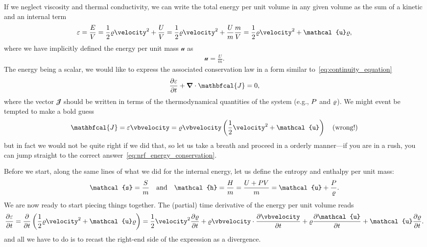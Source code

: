 If we neglect viscosity and thermal conductivity, we can write the total energy per
unit volume in any given volume as the sum of a kinetic and an internal term
\begin{align}
  \varepsilon = \frac{E}{V} = \frac{1}{2}\density \velocity^2 + \frac{U}{V} =
  \frac{1}{2}\density \velocity^2 + \frac{U}{m} \frac{m}{V} =
  \frac{1}{2}\density \velocity^2 + \mathcal{u} \density,
\end{align}
where we have implicitly defined the energy per unit mass $\mathcal{u}$ as
\begin{align*}
  \mathcal{u} = \frac{U}{m}.
\end{align*}
The energy being a scalar, we would like to express the associated conservation
law in a form similar to~\eqref{eq:continuity_equation}
\begin{align*}
  \pdv{\varepsilon}{t} + \vnabla \cdot \mathbfcal{J} = 0,
\end{align*}
where the vector $\mathbfcal{J}$ should be written in terms of the thermodynamical
quantities of the system (e.g., $P$ and $\varrho$). We might event be tempted
to make a bold guess
\begin{align*}
  \mathbfcal{J} = \varepsilon \vbvelocity =
  \density \vbvelocity \left( \frac{1}{2}\velocity^2 + \mathcal{u} \right)
  \quad \text{(wrong!)}
\end{align*}
but in fact we would not be quite right if we did that, so let us take a breath and proceed
in a orderly manner---if you are in a rush, you can jump straight to the correct
answer~\eqref{eq:nrf_energy_conservation}.

Before we start, along the same lines of what we did for the internal energy, let
us define the entropy and enthalpy per unit mass:
\begin{align*}
  \mathcal{s} = \frac{S}{m}
  \quad\text{and}\quad
  \mathcal{h} = \frac{H}{m} = \frac{U + \pressure V}{m} =
  \mathcal{u} + \frac{\pressure}{\density}.
\end{align*}
We are now ready to start piecing things together. The (partial) time derivative
of the energy per unit volume reads
\begin{align*}
  \pdv{\varepsilon}{t} =
  \pdv{}{t}\left( \frac{1}{2} \density \velocity^2 + \mathcal{u} \density \right) =
  \frac{1}{2} \velocity^2 \pdv{\density}{t} + \density \vbvelocity \cdot \pdv{\vbvelocity}{t} +
  \density \pdv{\mathcal{u}}{t} + \mathcal{u} \pdv{\density}{t}.
\end{align*}
and all we have to do is to recast the right-end side of the expression as a divergence.


